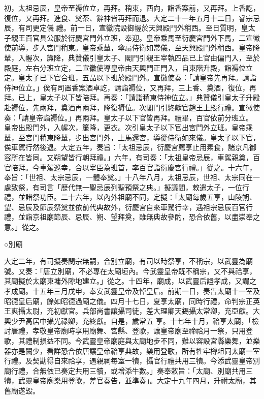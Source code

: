 \begin{pinyinscope}
 初，太祖忌辰，皇帝至褥位立，再拜。稍東，西向，詣香案前，又再拜。上香訖，復位，又再拜。進食、奠茶、辭神皆再拜而退。大定二十一年五月十二日，睿宗忌辰，有司更定儀
 禮。前一日，宣徽院設御幄於天興殿門外稍西。至日質明，皇太子親王百官具公服於衍慶宮門外立班，奉迎。皇帝乘馬至衍慶宮門外下馬，二宣徽使前導，步入宮門稍東。皇帝乘輦，傘扇侍衛如常儀，至天興殿門外稍西。皇帝降輦，入幄次，簾降，典贊儀引皇太子、閣門引親王宰執四品已上官由偏門入，至於殿庭，左右分班立定，二宣徽使導皇帝由天興門正門入，自東階升殿，詣褥位立定。皇太子已下官合班，五品以下班於殿門外。宣徽使奏：「請皇帝先再拜。請詣侍神位立。」俟有司置香案酒卓訖，請詣褥位，又再拜，三上香、奠酒，復位，再拜。已上，皇太子以下皆陪拜。再奏：「請詣稍東侍神位立。」典贊儀引皇太子升殿赴褥位，先兩拜，奠酒再兩拜，降復褥位。次閣門引終獻官趙王上殿行禮。宣徽使奏：「請皇帝詣褥位。」再兩拜。皇太子以下官皆再拜。禮畢，百官依前分班立。
 皇帝出殿門外，入幄次，簾降，更衣。次引皇太子以下官出宮門外立班。皇帝乘輦，至宮門稍東降輦，步出宮門外，上馬還宮，導從侍衛如來儀。皇太子以下官，俟車駕行然後退。大定五年，奏旨：「太祖忌辰，衍慶宮薦享止用素食，諸京凡御容所在皆同。又朔望皆行朝拜禮。」六年，有司奏：「太祖皇帝忌辰，車駕親奠，百官陪拜。今車駕巡幸，合以宰臣為班首，率百官詣衍慶宮行禮。」從之。十六年，奉旨：「世祖、太宗忌辰，一體奉奠。」十八年八月，太祖忌辰，世祖、太宗同在一處致祭，有司言「歷代無一聖忌辰列聖預祭之典。」擬議間，敕遣太子，一位行禮，並諸祭功臣。二十六年，以內外祖廟不同，定擬：「太廟每歲五享，山陵朔、望、忌辰及節辰祭奠並依前代典故外，衍慶宮自來車駕行幸，遇祖宗忌辰百官行禮，並詣京祖廟節辰、忌辰、朔、望拜奠，雖無典故參酌，恐合依舊，以盡崇奉之意。」從之。



 ○別廟



 大定二年，有司擬奏閔宗無嗣，合別立廟，有司以時祭享，不稱宗，以武靈為廟號。又奏：「唐立別廟，不必專在太廟垣內。今武靈皇帝既不稱宗，又不與祫享，其廟擬於太廟東墉外隙地建立。」從之。十四年，廟成，以武靈后謚孝成，又謂之孝成廟。十五年三月戊申，奉安武靈皇帝及悼皇后。前期一日，奏告太廟十一室及昭德皇后廟，餘如昭德過廟之儀。四月十七日，夏享太廟，同時行禮，命判宗正英王爽攝太尉，充初獻官。兵部尚書讓攝司徒，差大理卿天錫攝太常卿，充亞獻。大興少尹高居中攝光祿卿，充終獻。自是，歲常五
 享。十七年十月，祫享太廟，「檢討唐禮，孝敬皇帝廟時享用廟舞、宮縣、登歌，讓皇帝廟至禘祫月一祭，只用登歌，其禮制損益不同。今武靈皇帝廟庭與太廟地步不同，難以容設宮縣樂舞，並樂器亦是闕少，看詳恐合依唐讓皇帝祫享典故，樂用登歌，所有牲牢樽俎同太廟一室行禮。及契勘得自來祫享，遇親祠每室一犢，攝官行禮共用三犢。今添武靈皇帝別廟行禮，合無依已奏定共用三犢，或增添牛數。」奏奉敕旨：「太廟、別廟共用三犢，武靈皇帝廟樂用登歌，差官奏告，並準奏」。大定十九年四月，升祔太廟，其舊廟遂毀。




\end{pinyinscope}
